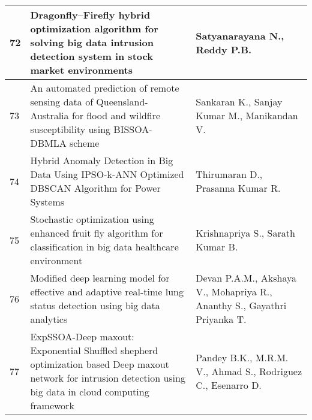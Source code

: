 \begin{landscape}
\begin{longtable}{|p{0.5cm}|p{9cm}|p{7cm}|}
    \hline
    72 & Dragonfly–Firefly hybrid optimization algorithm for solving big data intrusion detection system in stock market environments & Satyanarayana N., Reddy P.B. \\
    \hline
    73 & An automated prediction of remote sensing data of Queensland-Australia for flood and wildfire susceptibility using BISSOA-DBMLA scheme & Sankaran K., Sanjay Kumar M., Manikandan V. \\
    \hline
    74 & Hybrid Anomaly Detection in Big Data Using IPSO-k-ANN Optimized DBSCAN Algorithm for Power Systems & Thirumaran D., Prasanna Kumar R. \\
    \hline
    75 & Stochastic optimization using enhanced fruit fly algorithm for classification in big data healthcare environment & Krishnapriya S., Sarath Kumar B. \\
    \hline
    76 & Modified deep learning model for effective and adaptive real-time lung status detection using big data analytics & Devan P.A.M., Akshaya V., Mohapriya R., Ananthy S., Gayathri Priyanka T. \\
    \hline
    77 & ExpSSOA-Deep maxout: Exponential Shuffled shepherd optimization based Deep maxout network for intrusion detection using big data in cloud computing framework & Pandey B.K., M.R.M. V., Ahmad S., Rodriguez C., Esenarro D. \\
    \hline
    
    \end{longtable}
    \end{landscape}
    